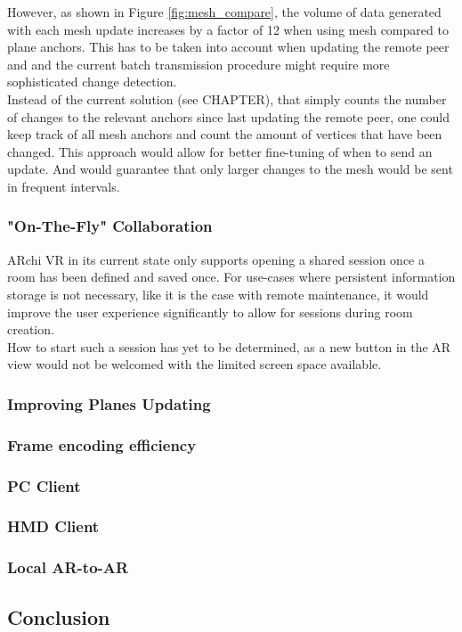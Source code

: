 \documentclass{article}
\begin{document}
However, as shown in Figure \ref{fig:mesh_compare}, the volume of data generated with each mesh update increases by a factor of 12 when using mesh compared to plane anchors. This has to be taken into account when updating the remote peer and and the current batch transmission procedure might require more sophisticated change detection. \\
Instead of the current solution (see CHAPTER), that simply counts the number of changes to the relevant anchors since last updating the remote peer, one could keep track of all mesh anchors and count the amount of vertices that have been changed. This approach would allow for better fine-tuning of when to send an update. And would guarantee that only larger changes to the mesh would be sent in frequent intervals.

\subsubsection{"On-The-Fly" Collaboration}
ARchi VR in its current state only supports opening a shared session once a room has been defined  and saved once. For use-cases where persistent information storage is not necessary, like it is the case with remote maintenance, it would improve the user experience significantly to allow for sessions during room creation.\\
How to start such a session has yet to be determined, as a new button in the AR view would not be welcomed with the limited screen space available.
\subsubsection{Improving Planes Updating}

\subsubsection{Frame encoding efficiency}
\subsubsection{PC Client}
\subsubsection{HMD Client}
\subsubsection{Local AR-to-AR}


\subsection{Conclusion}


\newpage


\end{document}

